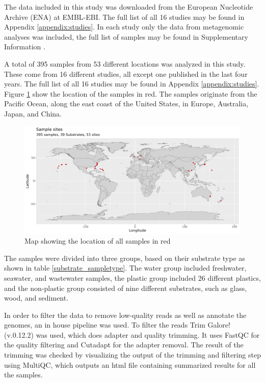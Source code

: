 The data included in this study was downloaded from the European Nucleotide Archive (ENA) at EMBL-EBI\cite{embl-ebi2025ENABrowser}. The full list of all 16 studies may be found in Appendix \ref{appendix:studies}. 
In each study only the data from metagenomic analyses was included, the full list of samples may be found in Supplementary Information .

A total of 395 samples from 53 different locations was analyzed in this study. These come from 16 different studies, all except one published in the last four years. The full list of all 16 studies may be found in Appendix \ref{appendix:studies}. 
Figure \ref{world_map} show the location of the samples in red. 
The samples originate from the Pacific Ocean, along the east coast of the United States, in Europe, Australia, Japan, and China. 

\begin{figure}[h]
    \centering
    \includegraphics[width = \textwidth]{figure/map.png}
    \caption{Map showing the location of all samples in red}
    \label{world_map}
\end{figure}

The samples were divided into three groups, based on their substrate type as shown in table \ref{substrate_sampletype}. The water group included freshwater, seawater, and wastewater samples, the plastic group included 26 different plastics, and the non-plastic group consisted of nine different substrates, such as glass, wood, and sediment.

In order to filter the data to remove low-quality reads  as well as annotate the genomes, an in house pipeline was used\cite{wenne2025Pipeline1}. 
To filter the reads Trim Galore! (v.0.12.2) \cite{krueger2023TrimGalore0122} was used, which does adapter and quality trimming. It uses FastQC for the quality filtering and Cutadapt for the adapter removal. 
The result of the trimming was checked by visualizing the output of the trimming and filtering step using MultiQC\cite{ewels2016MultiQCSummarizeAnalysis}, which outputs an html file containing summarized results for all the samples. 

